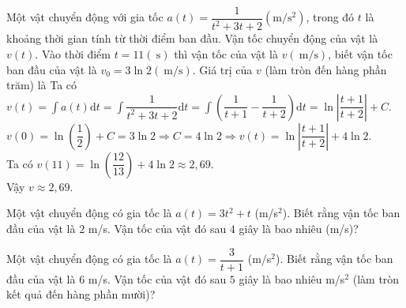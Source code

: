 \begin{ex}%
Một vật chuyển động với gia tốc $a(t)=\dfrac{1}{t^2+3 t+2} \left(\mathrm{m} / \mathrm{s}^2\right)$, trong đó $t$ là khoảng thời gian tính từ thời điểm ban đầu. Vận tốc chuyển động của vật là $v(t)$. Vào thời điểm $t=11(\mathrm{~s})$ thì vận tốc của vật là $v(\mathrm{~m} / \mathrm{s})$, biết vận tốc ban đầu của vật là $v_0=3 \ln 2(\mathrm{~m} / \mathrm{s})$. Giá trị của $v$ (làm tròn đến hàng phần trăm) là
\loigiai
{Ta có $v(t)=\displaystyle\int\limits a(t) \mathrm{d}t=\displaystyle\int\limits\dfrac{1}{t^2+3 t+2} \mathrm{d}t=\displaystyle\int\limits\left(\dfrac{1}{t+1}-\dfrac{1}{t+2}\right) \mathrm{d}t=\ln \left|\dfrac{t+1}{t+2}\right|+C$.\\
$v(0)=\ln \left(\dfrac{1}{2}\right)+C=3 \ln 2 \Rightarrow C=4 \ln 2 \Rightarrow v(t)=\ln \left|\dfrac{t+1}{t+2}\right|+4 \ln 2$.\\
Ta có $v(11)=\ln \left(\dfrac{12}{13}\right)+4 \ln 2 \approx 2{,}69$.\\
Vậy $v \approx 2{,}69$.
}
\end{ex}

\begin{ex}%
Một vật chuyển động có gia tốc là $a\left(t\right)=3 t^2+t$ (m/s$^2$). Biết rằng vận tốc ban đầu của vật là $2$ m/s. Vận tốc của vật đó sau $4$ giây là bao nhiêu (m/s)?
\end{ex}

\begin{ex}%
Một vật chuyển động có gia tốc là $a\left(t\right)=\dfrac{3}{t+1}$ (m/s$^2$). Biết rằng vận tốc ban đầu của vật là $6$ m/s. Vận tốc của vật đó sau $5$ giây là bao nhiêu m/s$^2$ (làm tròn kết quả đến hàng phần mười)?
\end{ex}

